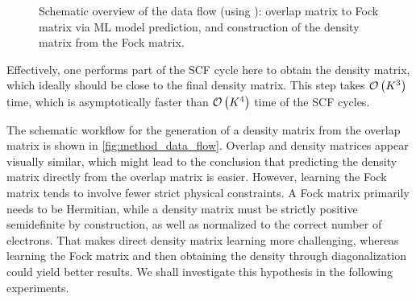 \begin{figure}[H]
    \caption[Schematic overview data flow]{Schematic overview of the data flow (using ): overlap matrix to Fock matrix via ML model prediction, and construction of the density matrix from the Fock matrix.}
    \label{fig:method_data_flow}
\end{figure}
Effectively, one performs part of the SCF cycle here to obtain the density matrix, which ideally should be close to the final density matrix. This step takes $\mathcal{O}\left(K^3\right)$ time, which is asymptotically faster than $\mathcal{O}\left(K^4\right)$ time of the SCF cycles. 

The schematic workflow for the generation of a density matrix from the overlap matrix is shown in \autoref{fig:method_data_flow}. Overlap and density matrices appear visually similar, which might lead to the conclusion that predicting the density matrix directly from the overlap matrix is easier. However, learning the Fock matrix tends to involve fewer strict physical constraints. A Fock matrix primarily needs to be Hermitian, while a density matrix must be strictly positive semidefinite by construction, as well as normalized to the correct number of electrons. That makes direct density matrix learning more challenging, whereas learning the Fock matrix and then obtaining the density through diagonalization could yield better results. We shall investigate this hypothesis in the following experiments.\\


